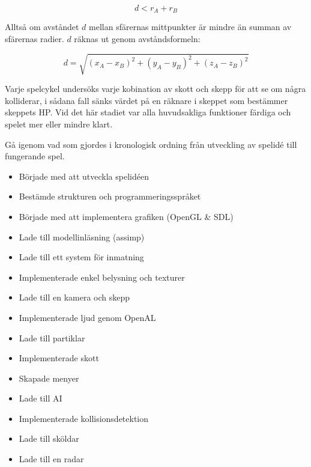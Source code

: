 \documentclass[12pt, a4paper]{article}
\begin{document}
	\begin{equation}
		d < r_A + r_B
	\end{equation}
	
	Alltså om avståndet $d$ mellan sfärernas mittpunkter är mindre än summan av sfärernas radier. $d$ räknas ut genom avståndsformeln:
	
	\begin{equation}
		d = \sqrt{(x_A - x_B)^2 + (y_A - y_B)^2 + (z_A - z_B)^2}
	\end{equation}
	
	Varje spelcykel undersöks varje kobination av skott och skepp för att se om några kolliderar, i sådana fall sänks värdet på en räknare i skeppet som bestämmer skeppets HP. Vid det här stadiet var alla huvudsakliga funktioner färdiga och spelet mer eller mindre klart. 
	
	Gå igenom vad som gjordes i kronologisk ordning från utveckling av spelidé till fungerande spel. 
	
	\begin{itemize}
		\item Började med att utveckla spelidéen
		\item Bestämde strukturen och programmeringsspråket
		\item Började med att implementera grafiken (OpenGL \& SDL)
		\item Lade till modellinläsning (assimp)
		\item Lade till ett system för inmatning
		\item Implementerade enkel belysning och texturer
		\item Lade till en kamera och skepp
		\item Implementerade ljud genom OpenAL
		\item Lade till partiklar
		\item Implementerade skott
		\item Skapade menyer
		\item Lade till AI
		\item Implementerade kollisionsdetektion
		\item Lade till sköldar
		\item Lade till en radar
	\end{itemize}
	
\end{document}
